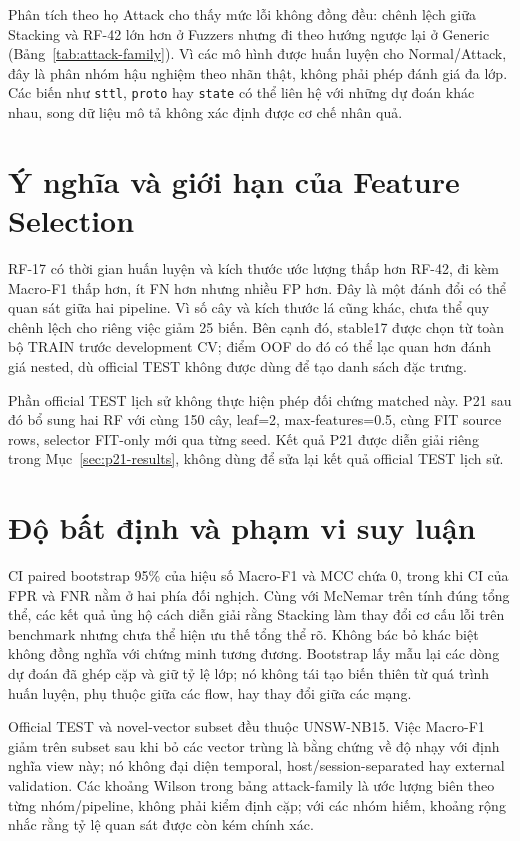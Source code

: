 Phân tích theo họ Attack cho thấy mức lỗi không đồng đều: chênh lệch giữa Stacking và RF-42 lớn hơn ở Fuzzers nhưng đi theo hướng ngược lại ở Generic (Bảng~\ref{tab:attack-family}). Vì các mô hình được huấn luyện cho Normal/Attack, đây là phân nhóm hậu nghiệm theo nhãn thật, không phải phép đánh giá đa lớp. Các biến như \texttt{sttl}, \texttt{proto} hay \texttt{state} có thể liên hệ với những dự đoán khác nhau, song dữ liệu mô tả không xác định được cơ chế nhân quả.

\section{Ý nghĩa và giới hạn của Feature Selection}
\label{sec:discussion-feature-selection}

RF-17 có thời gian huấn luyện và kích thước ước lượng thấp hơn RF-42, đi kèm Macro-F1 thấp hơn, ít FN hơn nhưng nhiều FP hơn. Đây là một đánh đổi có thể quan sát giữa hai pipeline. Vì số cây và kích thước lá cũng khác, chưa thể quy chênh lệch cho riêng việc giảm 25 biến. Bên cạnh đó, stable17 được chọn từ toàn bộ TRAIN trước development CV; điểm OOF do đó có thể lạc quan hơn đánh giá nested, dù official TEST không được dùng để tạo danh sách đặc trưng.

Phần official TEST lịch sử không thực hiện phép đối chứng matched này. P21 sau đó bổ sung hai RF với cùng 150 cây, leaf=2, max-features=0.5, cùng FIT source rows, selector FIT-only mới qua từng seed. Kết quả P21 được diễn giải riêng trong Mục~\ref{sec:p21-results}, không dùng để sửa lại kết quả official TEST lịch sử.

\section{Độ bất định và phạm vi suy luận}
\label{sec:discussion-uncertainty}

CI paired bootstrap 95\% của hiệu số Macro-F1 và MCC chứa 0, trong khi CI của FPR và FNR nằm ở hai phía đối nghịch. Cùng với McNemar trên tính đúng tổng thể, các kết quả ủng hộ cách diễn giải rằng Stacking làm thay đổi cơ cấu lỗi trên benchmark nhưng chưa thể hiện ưu thế tổng thể rõ. Không bác bỏ khác biệt không đồng nghĩa với chứng minh tương đương. Bootstrap lấy mẫu lại các dòng dự đoán đã ghép cặp và giữ tỷ lệ lớp; nó không tái tạo biến thiên từ quá trình huấn luyện, phụ thuộc giữa các flow, hay thay đổi giữa các mạng.

Official TEST và novel-vector subset đều thuộc UNSW-NB15. Việc Macro-F1 giảm trên subset sau khi bỏ các vector trùng là bằng chứng về độ nhạy với định nghĩa view này; nó không đại diện temporal, host/session-separated hay external validation. Các khoảng Wilson trong bảng attack-family là ước lượng biên theo từng nhóm/pipeline, không phải kiểm định cặp; với các nhóm hiếm, khoảng rộng nhắc rằng tỷ lệ quan sát được còn kém chính xác.

